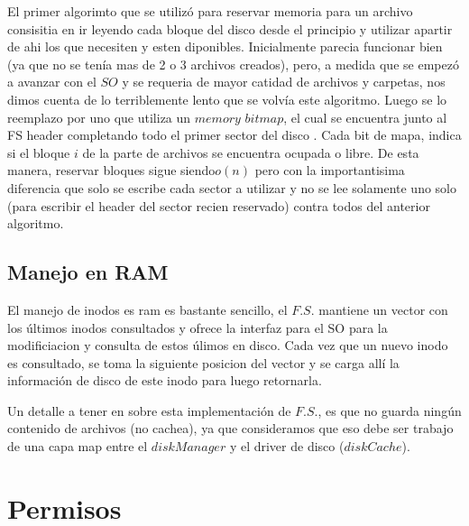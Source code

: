 \documentclass[english]{article}
\begin{document}
El primer algorimto que se utilizó para reservar memoria para un archivo
consisitia en ir leyendo cada bloque del disco desde el principio
y utilizar apartir de ahi los que necesiten y esten diponibles. Inicialmente
parecia funcionar bien (ya que no se tenía mas de 2 o 3 archivos creados),
pero, a medida que se empezó a avanzar con el $SO$ y se requeria
de mayor catidad de archivos y carpetas, nos dimos cuenta de lo terriblemente
lento que se volvía este algoritmo. Luego se lo reemplazo por uno
que utiliza un $memory$ $bitmap$, el cual se encuentra junto al
FS header completando todo el primer sector del disco . Cada bit de
mapa, indica si el bloque $i$ de la parte de archivos se encuentra
ocupada o libre. De esta manera, reservar bloques sigue siendo$o(n)$
pero con la importantisima diferencia que solo se escribe cada sector
a utilizar y no se lee solamente uno solo (para escribir el header
del sector recien reservado) contra todos del anterior algoritmo.


\subsection{Manejo en RAM}

El manejo de inodos es ram es bastante sencillo, el $F.S.$ mantiene
un vector con los últimos inodos consultados y ofrece la interfaz
para el SO para la modificiacion y consulta de estos úlimos en disco.
Cada vez que un nuevo inodo es consultado, se toma la siguiente posicion
del vector y se carga allí la información de disco de este inodo para
luego retornarla.

Un detalle a tener en sobre esta implementación de $F.S.$, es que
no guarda ningún contenido de archivos (no cachea), ya que consideramos
que eso debe ser trabajo de una capa map entre el $diskManager$ y
el driver de disco ($diskCache$).

\pagebreak{}

\section{Permisos}
\end{document}
